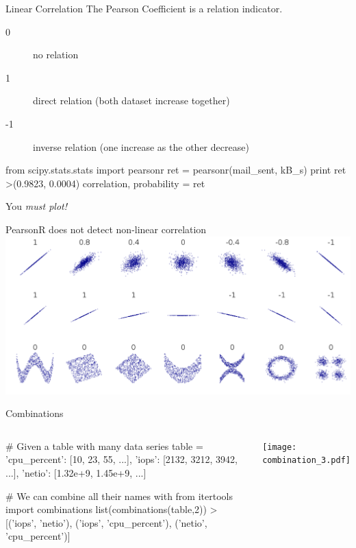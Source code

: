 \begin{pyframe}{Linear Correlation}
The Pearson Coefficient is a relation indicator. 
\begin{description}
\item[0]  no relation
\item[1]  direct relation (both dataset increase together)
\item[-1]  inverse relation (one increase as the other decrease) 
\end{description}

\begin{pythoncode}
from scipy.stats.stats import pearsonr
ret = pearsonr(mail_sent, kB_s)
print ret 
>(0.9823, 0.0004)
correlation, probability = ret
\end{pythoncode}
\end{pyframe}

\begin{pyframe}{You \emph{must plot!}}
\LARGE
\begin{center}
PearsonR does not detect non-linear correlation \\
\includegraphics[width=.8\textwidth]{correlation.pdf} \\
\end{center}
\end{pyframe}


\begin{pyframe}{Combinations }
\begin{columns}

\begin{pythoncode}
# Given a table with many data series
table = {'cpu_percent': [10, 23, 55, ...],
        'iops': [2132, 3212, 3942, ...],
        'netio': [1.32e+9, 1.45e+9, ...]}

# We can combine all their names with
from itertools import combinations
list(combinations(table,2))
>[('iops', 'netio'), ('iops', 'cpu_percent'), 
  ('netio', 'cpu_percent')]
\end{pythoncode}
\texttt{[image: combination\_3.pdf]}
\end{columns}
\end{pyframe}


